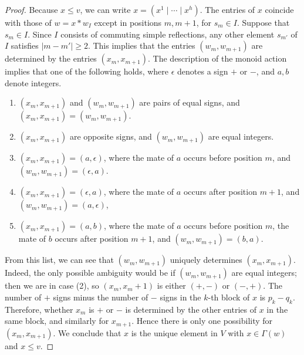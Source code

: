 \documentclass[11pt,letterpaper,reqno]{amsart}
\numberwithin{equation}{section}
\theoremstyle{plain}
\theoremstyle{definition}
\theoremstyle{remark}
\begin{document}
\begin{proof}
Because $x \leq v$, we can write
$x=(x^1 \mid \cdots \mid x^h)$.
The entries of $x$ coincide with those of
$w = x*w_I$ except in positions $m, m+1$, for $s_m \in I$. 
Suppose that $s_m \in I$.  Since $I$ consists of commuting simple reflections,
any other element $s_{m'}$ of $I$ satisfies $|m - m'| \geq 2$.  This implies that the entries $(w_m, w_{m+1})$ are determined by the entries
$(x_m, x_{m+1})$.  The description of the monoid action
implies that one of the following holds, where $\epsilon$ denotes a sign $+$ or $-$, and $a, b$ denote integers.
\begin{enumerate}
\item $(x_m, x_{m+1})$ and $(w_m, w_{m+1})$ are pairs of equal signs, and   $(x_m, x_{m+1}) =(w_m, w_{m+1})$. 
\item $(x_m, x_{m+1})$ are opposite signs, and $(w_m, w_{m+1})$ are equal integers.
\item $(x_m, x_{m+1}) = (a, \epsilon)$, where the mate of $a$ occurs before position $m$, and
$(w_m, w_{m+1}) = (\epsilon, a)$.
\item $(x_m, x_{m+1}) = (\epsilon, a)$, where the mate of $a$ occurs after position $m+1$, and $(w_m, w_{m+1}) = (a, \epsilon)$, 
\item $(x_m, x_{m+1}) = (a, b)$, where the mate of $a$ occurs before position $m$, the mate of $b$ occurs after position $m+1$,
and $(w_m, w_{m+1}) = (b,a)$.
\end{enumerate}
 From this
list, we can see that $(w_m, w_{m+1})$ uniquely determines $(x_m, x_{m+1})$.  Indeed, the only possible ambiguity would
be if $(w_m, w_{m+1})$ are equal integers; then we are in case (2), so $(x_m, x_m+1)$ is either
$(+,-)$ or $(-,+)$.  The number of $+$ signs minus the number of $-$ signs in the $k$-th block of $x$
is $p_k - q_k$.  Therefore, whether $x_m$ is $+$ or $-$ is determined by the other entries
of $x$ in the same block, and similarly for $x_{m+1}$.  Hence there is only one possibility for $(x_m, x_{m+1})$.
We conclude that $x$ is the unique element in $V$ with $x \in \Gamma(w)$ and $x \leq v$.  
\end{proof}
\end{document}
